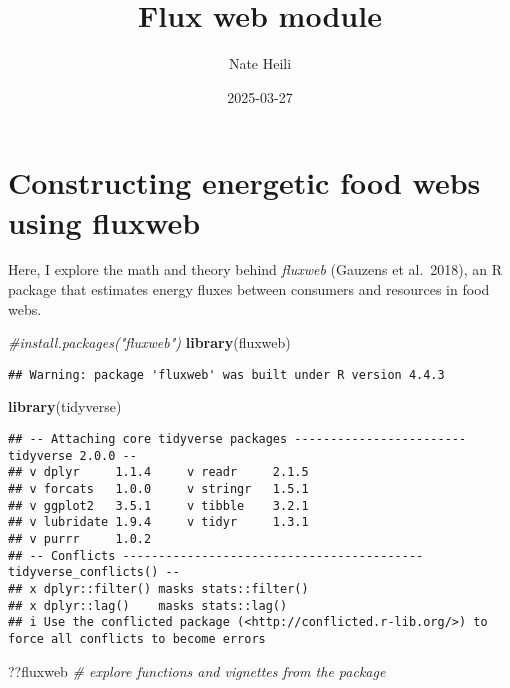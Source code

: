\documentclass[
]{article}
\title{Flux web module}
\author{Nate Heili}
\date{2025-03-27}
\newenvironment{Shaded}{\begin{snugshade}}{\end{snugshade}}
\newcommand{\CommentTok}[1]{\textcolor[rgb]{0.56,0.35,0.01}{\textit{#1}}}
\newcommand{\FunctionTok}[1]{\textcolor[rgb]{0.13,0.29,0.53}{\textbf{#1}}}
\newcommand{\NormalTok}[1]{#1}
\begin{document}
\maketitle

\section{Constructing energetic food webs using
fluxweb}\label{constructing-energetic-food-webs-using-fluxweb}

Here, I explore the math and theory behind \emph{fluxweb} (Gauzens et
al.~2018), an R package that estimates energy fluxes between consumers
and resources in food webs.

\begin{Shaded}
\begin{Highlighting}[]
\CommentTok{\#install.packages("fluxweb")}
\FunctionTok{library}\NormalTok{(fluxweb)}
\end{Highlighting}
\end{Shaded}

\begin{verbatim}
## Warning: package 'fluxweb' was built under R version 4.4.3
\end{verbatim}

\begin{Shaded}
\begin{Highlighting}[]
\FunctionTok{library}\NormalTok{(tidyverse)}
\end{Highlighting}
\end{Shaded}

\begin{verbatim}
## -- Attaching core tidyverse packages ------------------------ tidyverse 2.0.0 --
## v dplyr     1.1.4     v readr     2.1.5
## v forcats   1.0.0     v stringr   1.5.1
## v ggplot2   3.5.1     v tibble    3.2.1
## v lubridate 1.9.4     v tidyr     1.3.1
## v purrr     1.0.2     
## -- Conflicts ------------------------------------------ tidyverse_conflicts() --
## x dplyr::filter() masks stats::filter()
## x dplyr::lag()    masks stats::lag()
## i Use the conflicted package (<http://conflicted.r-lib.org/>) to force all conflicts to become errors
\end{verbatim}

\begin{Shaded}
\begin{Highlighting}[]
\NormalTok{??fluxweb }\CommentTok{\# explore functions and vignettes from the package}
\end{Highlighting}
\end{Shaded}
\end{document}

